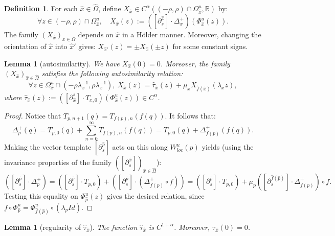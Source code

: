 \documentclass[a4paper]{article}
\newtheorem{lemma}[theorem]{Lemma}
\theoremstyle{definition}
\newtheorem{definition}{Definition}[section]
\begin{document}
\begin{definition}
For each ${\widehat{x}} \in \widehat{\Omega}$,  define $X_{\widehat{x}} \in C^{\alpha}((-\rho,\rho) \cap \Omega_{\widehat{x}}^u,\mathbb{R}) $ by:
$$ \forall z \in (-\rho,\rho) \cap \Omega_{\widehat{x}}^u, \quad X_{\widehat{x}}(z) := ([\partial_s^{\widehat{x}}] \cdot \Delta_{x}^+)(\Phi_{\widehat{x}}^u(z)).$$
The family $(X_{\widehat{x}})_{x \in \Omega}$ depends on ${\widehat{x}}$ in a Hölder manner. Moreover, changing the orientation of $\widehat{x}$ into $\widehat{x}'$ gives: $X_{\widehat{x}'}(z) = \pm X_{\widehat{x}}(\pm z)$ for some constant signs.
\end{definition}

\begin{lemma}[autosimilarity]
We have $X_{\widehat{x}}(0)=0$. Moreover, the family $(X_{\widehat{x}})_{\widehat{x} \in \widehat{\Omega}}$ satisfies the following autosimilarity relation:
$$\forall z \in \Omega_{\widehat{x}}^u \cap (-\rho \lambda_x^{-1},\rho \lambda_x^{-1}), \ X_{\widehat{x}}(z) = \widehat{\tau}_{\widehat{x}}(z) + \mu_x X_{\widehat{f}({\widehat{x}})}(\lambda_x z) ,$$
where $\widehat{\tau}_{\widehat{x}}(z) := ([\partial_{\widehat{x}}^s] \cdot T_{x,0})(\Phi_{\widehat{x}}^u(z)) \in C^{\alpha}$.
\end{lemma}

\begin{proof}
Notice that $T_{p,n+1}(q) = T_{f(p),n}(f(q))$. It follows that:
$$ \Delta_p^+(q) = T_{p,0}(q) + \sum_{n=0}^\infty T_{f(p),n}(f(q)) = T_{p,0}(q) + \Delta_{f(p)}^+(f(q)) .$$
Making the vector template $[\partial_s^{\widehat{p}}]$ acts on this along $W^u_{loc}(p)$ yields (using the invariance properties of the family $([\partial_s^{\widehat{x}}])_{\widehat{x} \in \widehat{\Omega}}$):
$$([\partial_s^{\widehat{p}}] \cdot \Delta_p^+) = ([\partial_s^{\widehat{p}}] \cdot T_{p,0}) + ([\partial_s^{\widehat{p}}] \cdot (\Delta_{f(p)}^+ \circ f)) = ([\partial_s^{\widehat{p}}] \cdot T_{p,0}) + \mu_p ([\partial_s^{\widehat{f}({\widehat{p}})}] \cdot \Delta_{f(p)}^+) \circ f  .$$
Testing this equality on $\Phi_{\widehat{p}}^u(z)$ gives the desired relation, since $f \circ \Phi_{\widehat{p}}^u = \Phi_{\widehat{f}({\widehat{p}})}^u \circ (\lambda_p Id )$.
\end{proof}

\begin{lemma}[regularity of $\widehat{\tau}_{\widehat{x}}$]\label{lem:reg1}
The function $\widehat{\tau}_{\widehat{x}}$ is $C^{1+\alpha}$. Moreover, $\tau_{\widehat{x}}(0)=0$.
\end{lemma}
\end{document}
